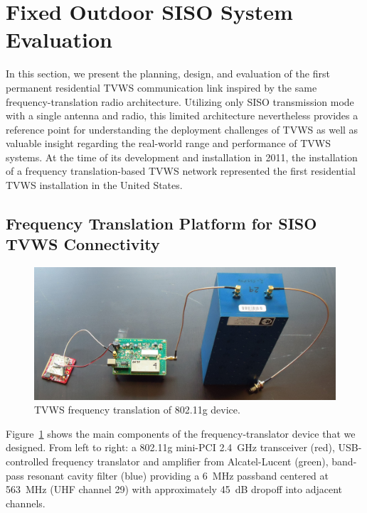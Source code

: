 \section{Fixed Outdoor SISO System Evaluation}
\label{sec_siso_tvws}

	In this section, we present the planning, design, and evaluation of the first permanent residential \ac{TVWS} communication link inspired by the same frequency-translation radio architecture.
	Utilizing only \ac{SISO} transmission mode with a single antenna and radio, this limited architecture nevertheless provides a reference point for understanding the deployment challenges of TVWS as well as valuable insight regarding the real-world range and performance of TVWS systems.
	At the time of its development and installation in 2011, the installation of a frequency translation-based \ac{TVWS} network represented the first residential TVWS installation in the United States.

\subsection{Frequency Translation Platform for SISO TVWS Connectivity}
\label{sec_freq_xlator_platform}

\begin{figure}[ht]
\centering
  	\includegraphics[width=1\linewidth]{figs/wardrive/TFA_translator_chain}   
   	\caption{TVWS frequency translation of 802.11g device.
	\label{fig_freq_translator_hw}}
\end{figure}

	Figure~\ref{fig_freq_translator_hw} shows the main components of the frequency-translator device that we designed.
	From left to right: a 802.11g mini-PCI 2.4~GHz transceiver (red), USB-controlled frequency translator and amplifier from Alcatel-Lucent (green), band-pass resonant cavity filter (blue) providing a 6~MHz passband centered at 563~MHz (UHF channel 29) with approximately 45~dB dropoff into adjacent channels.

